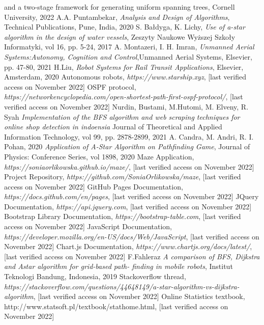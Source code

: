 \begin{thebibliography}{100}
{and a two-stage framework for generating uniform spanning trees}, Cornell University, 2022
A.A. Puntambekar, \emph{Analysis and Design of Algorithms}, Technical Publications, Pune, India, 2020
S. Bałdyga, K. Lichy, \emph{Use of a-star algorithm in the design of water vessels}, Zeszyty Naukowe Wyższej Szkoły Informatyki,
vol 16, pp. 5-24, 2017
A. Montazeri, I. H. Imran, \emph{Unmanned Aerial Systems:Autonomy, Cognition and Control},Unmanned Aerial Systems,
Elsevier, pp. 47-80, 2021
H.Liu, \emph{Robot Systems for Rail Transit Applications}, Elsevier, Amsterdam, 2020
Autonomous robots, \emph{https://www.starship.xyz}, [last verified access on November 2022]
OSPF protocol, \emph{https://networkencyclopedia.com/open-shortest-path-first-ospf-protocol/},
[last verified access on November 2022]
Nurdin, Bustami, M.Hutomi, M. Elveny, R. Syah \emph{Implementation of the BFS algorithm and web scraping techniques
for online shop detection in indoensia} Journal of Theoretical and Applied Information Technology, vol 99, pp. 2878-2899, 2021
A. Candra, M. Andri, R. I. Pohan, 2020 \emph{Application of A-Star Algorithm on Pathfinding Game},
Journal of Physics: Conference Series, vol 1898, 2020
Maze Application, \emph{https://soniaorlikowska.github.io/maze/}, [last verified access on November 2022]
Project Repository, \emph{https://github.com/SoniaOrlikowska/maze}, [last verified access on November 2022]
GitHub Pages Documentation, \emph{https://docs.github.com/en/pages}, [last verified access on November 2022]
JQuery Documentation, \emph{https://api.jquery.com}, [last verified access on November 2022]
Bootstrap Library Documentation, \emph{https://bootstrap-table.com}, [last verified access on November 2022]
 JavaScript Documentation, \emph{https://developer.mozilla.org/en-US/docs/Web/JavaScript}, [last verified access on November 2022]
 Chart.js Documentation, \emph{https://www.chartjs.org/docs/latest/}, [last verified access on November 2022]
F.Fahleraz \emph{A comparison of BFS, Dijkstra and Astar algorithm for grid-based path- finding in mobile robots}, 
Institut Teknologi Bandung, Indonesia, 2019
 Stackoverflow thread, \emph{https://stackoverflow.com/questions/44648149/a-star-algorithm-vs-dijkstra-algorithm},
[last verified access on November 2022]
 Online Statistics textbook, http://www.statsoft.pl/textbook/stathome.html, [last verified access on November 2022]
\end{thebibliography}
